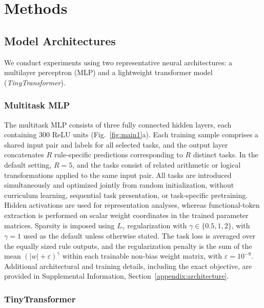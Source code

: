 \documentclass{article}
\begin{document}
\section{Methods}

\subsection{Model Architectures}

We conduct experiments using two representative neural architectures: a multilayer perceptron (MLP) and a lightweight transformer model (\textit{TinyTransformer}).

\subsubsection{Multitask MLP}

The multitask MLP consists of three fully connected hidden layers, each containing 300 ReLU units (Fig.~\ref{fig:main1}a). Each training sample comprises a shared input pair and labels for all selected tasks, and the output layer concatenates $R$ rule-specific predictions corresponding to $R$ distinct tasks. In the default setting, $R=5$, and the tasks consist of related arithmetic or logical transformations applied to the same input pair. All tasks are introduced simultaneously and optimized jointly from random initialization, without curriculum learning, sequential task presentation, or task-specific pretraining. Hidden activations are used for representation analyses, whereas functional-token extraction is performed on scalar weight coordinates in the trained parameter matrices. Sparsity is imposed using $L_\gamma$ regularization with $\gamma\in\{0.5,1,2\}$, with $\gamma=1$ used as the default unless otherwise stated. The task loss is averaged over the equally sized rule outputs, and the regularization penalty is the sum of the mean $(|w|+\varepsilon)^\gamma$ within each trainable non-bias weight matrix, with $\varepsilon=10^{-8}$. Additional architectural and training details, including the exact objective, are provided in Supplemental Information, Section~\ref{appendix:architecture}.

\subsubsection{TinyTransformer}
\end{document}
